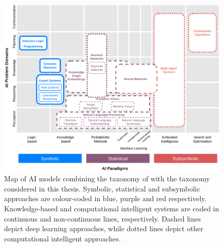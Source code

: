\begin{figure}
    \centering
    \includegraphics[width=\linewidth]{3_stateoftheart/figures/AI_Map.eps}
    \caption{Map of AI models combining the taxonomy of \cite{corea_ai_2019} with the taxonomy considered in this thesis. Symbolic, statistical and subsymbolic approaches are colour-coded in blue, purple and red respectively. Knowledge-based and computational intelligent systems are coded in continuous and non-continuous lines, respectively. Dashed lines depict deep learning approaches, while dotted lines depict other computational intelligent approaches.}
    \label{fig:ai_map}
\end{figure}


